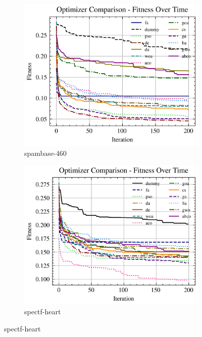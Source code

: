 \begin{figure}[htp]
    \centering
    \begin{subfigure}[htp]{0.45\textwidth}
        \includegraphics[width=\textwidth]{imagenes/fitness_charts/img/binary/spambase-460/optimizers_fitness_svc.png}
        \caption{spambase-460}
        \label{fig:convergencia_spambase-460_svc}
    \end{subfigure}
    \begin{subfigure}[htp]{0.45\textwidth}
        \includegraphics[width=\textwidth]{imagenes/fitness_charts/img/binary/spectf-heart/optimizers_fitness_svc.png}
        \caption{spectf-heart}
        \label{fig:convergencia_spectf-heart_svc}
    \end{subfigure}


\end{figure}
